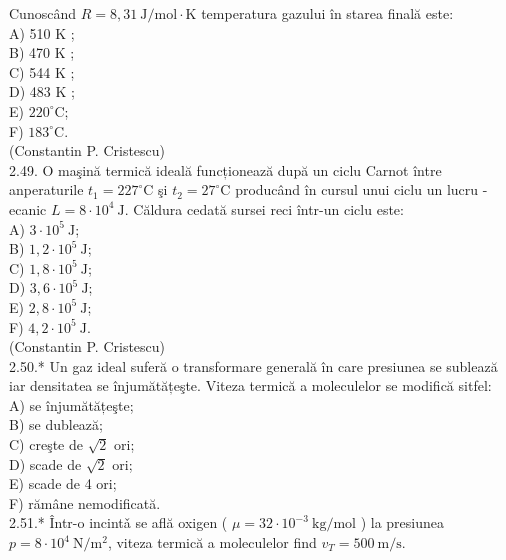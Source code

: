 \documentclass[10pt]{article}
\begin{document}
Cunoscând $R=8,31 \mathrm{~J} / \mathrm{mol} \cdot \mathrm{K}$ temperatura gazului în starea finală este:\\
A) 510 K ;\\
B) 470 K ;\\
C) 544 K ;\\
D) 483 K ;\\
E) $220^{\circ} \mathrm{C}$;\\
F) $183^{\circ} \mathrm{C}$.\\
(Constantin P. Cristescu)\\
2.49. O maşină termică ideală funcționează după un ciclu Carnot între anperaturile $t_{1}=227^{\circ} \mathrm{C}$ şi $t_{2}=27^{\circ} \mathrm{C}$ producând în cursul unui ciclu un lucru -ecanic $L=8 \cdot 10^{4} \mathrm{~J}$. Căldura cedată sursei reci într-un ciclu este:\\
A) $3 \cdot 10^{5} \mathrm{~J}$;\\
B) $1,2 \cdot 10^{5} \mathrm{~J}$;\\
C) $1,8 \cdot 10^{5} \mathrm{~J}$;\\
D) $3,6 \cdot 10^{5} \mathrm{~J}$;\\
E) $2,8 \cdot 10^{5} \mathrm{~J}$;\\
F) $4,2 \cdot 10^{5} \mathrm{~J}$.\\
(Constantin P. Cristescu)\\
2.50.* Un gaz ideal suferă o transformare generală în care presiunea se sublează iar densitatea se înjumătățeşte. Viteza termică a moleculelor se modifică sitfel:\\
A) se înjumătățeşte;\\
B) se dublează;\\
C) creşte de $\sqrt{2}$ ori;\\
D) scade de $\sqrt{2}$ ori;\\
E) scade de 4 ori;\\
F) rămâne nemodificată.\\
2.51.* Într-o incintǎ se află oxigen ( $\mu=32 \cdot 10^{-3} \mathrm{~kg} / \mathrm{mol}$ ) la presiunea $p=8 \cdot 10^{4} \mathrm{~N} / \mathrm{m}^{2}$, viteza termică a moleculelor find $v_{T}=500 \mathrm{~m} / \mathrm{s}$.
\end{document}
